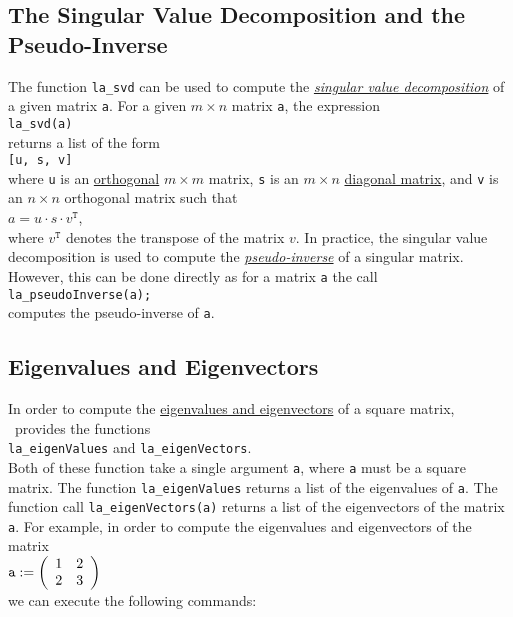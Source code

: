 \subsection{The Singular Value Decomposition and the Pseudo-Inverse}
The function \texttt{la\_svd} can be used to compute the 
\href{http://en.wikipedia.org/wiki/Singular_value_decomposition}{\emph{singular value decomposition}} 
of a given matrix \texttt{a}.  For a given $m \times n$ matrix \texttt{a}, the expression 
\\[0.2cm]
\hspace*{1.3cm}
\texttt{la\_svd(a)}
\\[0.2cm]
returns a list of the form
\\[0.2cm]
\hspace*{1.3cm}
\texttt{[u, s, v]}
\\[0.2cm]
where \texttt{u} is an 
\href{http://en.wikipedia.org/wiki/Orthogonal_matrix}{orthogonal} $m \times m$ matrix, \texttt{s}
is an $m \times n$ 
\href{http://en.wikipedia.org/wiki/Diagonal_matrix}{diagonal matrix}, and \texttt{v} is an $n \times n$
orthogonal matrix such that
\\[0.2cm]
\hspace*{1.3cm}
$a = u \cdot s \cdot v^{\mathtt{T}}$,
\\[0.2cm]
where $v^{\mathtt{T}}$ denotes the transpose of the matrix $v$.
  In practice, the singular value decomposition is used to compute the
\href{http://en.wikipedia.org/wiki/Moore-Penrose_pseudoinverse}{\emph{pseudo-inverse}}
 of a singular matrix.   However, this can be done directly as for a matrix \texttt{a} the call
\\[0.2cm]
\hspace*{1.3cm}
\texttt{la\_pseudoInverse(a);}
\\[0.2cm]
computes the pseudo-inverse of \texttt{a}.

\subsection{Eigenvalues and Eigenvectors}
In order to compute the 
\href{http://en.wikipedia.org/wiki/Eigenvalues_and_eigenvectors}{eigenvalues and eigenvectors} of a
square matrix, \setlx\ provides the functions
\\[0.2cm]
\hspace*{1.3cm}
\texttt{la\_eigenValues} \quad and \quad \texttt{la\_eigenVectors}.
\\[0.2cm]
Both of these function take a single argument \texttt{a}, where \texttt{a} must be a square matrix.
The function \texttt{la\_eigenValues} returns a list of the eigenvalues of \texttt{a}.  The
function call \texttt{la\_eigenVectors(a)} returns a list of the eigenvectors of the matrix \texttt{a}.
For example, in order to compute the eigenvalues and eigenvectors of the matrix
\\[0.2cm]
\hspace*{1.3cm}
$\mathtt{a} :=
\left(\begin{array}[c]{ll}
  1 & 2 \\
  2 & 3
\end{array}\right)
$
\\[0.2cm]
we can execute the following commands:

